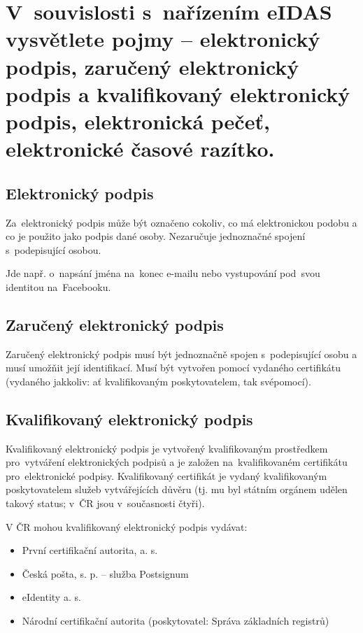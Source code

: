 

\clearpage
\section{V~souvislosti s~nařízením eIDAS vysvětlete pojmy -- elektronický podpis, zaručený elektronický podpis a kvalifikovaný elektronický podpis, elektronická pečeť, elektronické časové razítko.}

\subsection{Elektronický podpis}

Za~elektronický podpis může být označeno cokoliv, co má elektronickou podobu a co je použito jako podpis dané osoby.
Nezaručuje jednoznačné spojení s~podepisující osobou.

Jde např. o~napsání jména na~konec e-mailu nebo vystupování pod~svou identitou na~Facebooku.


\subsection{Zaručený elektronický podpis}

Zaručený elektronický podpis musí být jednoznačně spojen s~podepisující osobu a musí umožňit její identifikací.
Musí být vytvořen pomocí vydaného certifikátu (vydaného jakkoliv: ať kvalifikovaným poskytovatelem, tak svépomocí).


\subsection{Kvalifikovaný elektronický podpis}

Kvalifikovaný elektronický podpis je vytvořený kvalifikovaným prostředkem pro~vytváření elektronických podpisů a je založen na~kvalifikovaném certifikátu pro~elektronické podpisy.
Kvalifikovaný certifikát je vydaný kvalifikovaným poskytovatelem služeb vytvářejících důvěru (tj. mu byl státním orgánem udělen takový status; v~ČR jsou v~současnosti čtyři).

V ČR mohou kvalifikovaný elektronický podpis vydávat:
\begin{itemize}
\item První certifikační autorita, a. s.
\item Česká pošta, s. p. – služba Postsignum
\item eIdentity a. s.
\item Národní certifikační autorita (poskytovatel: Správa základních registrů)
\end{itemize}

